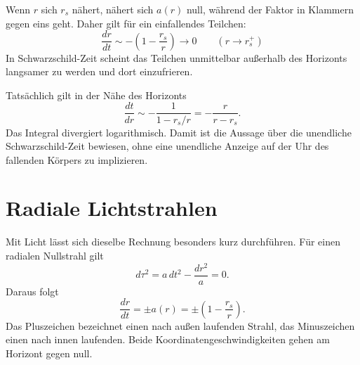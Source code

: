 Wenn \(r\) sich \(r_s\) nähert, nähert sich \(a(r)\) null, während der Faktor in Klammern gegen eins geht. Daher gilt für ein einfallendes Teilchen:
\begin{equation}
\frac{dr}{dt}
\sim -\left(1-\frac{r_s}{r}\right)
\longrightarrow 0
\qquad(r\longrightarrow r_s^+)
\label{eq:l5-infall-freeze}
\end{equation}
In Schwarzschild-Zeit scheint das Teilchen unmittelbar außerhalb des Horizonts langsamer zu werden und dort einzufrieren.

\begin{classroomqa}
\end{classroomqa}

Tatsächlich gilt in der Nähe des Horizonts
\begin{equation}
\frac{dt}{dr}
\sim-\frac{1}{1-r_s/r}
=-\frac{r}{r-r_s}.
\end{equation}
Das Integral divergiert logarithmisch. Damit ist die Aussage über die unendliche Schwarzschild-Zeit bewiesen, ohne eine unendliche Anzeige auf der Uhr des fallenden Körpers zu implizieren.

\section{Radiale Lichtstrahlen}

Mit Licht lässt sich dieselbe Rechnung besonders kurz durchführen. Für einen radialen Nullstrahl gilt
\begin{equation}
d\tau^2
=a\,dt^2-\frac{dr^2}{a}=0.
\end{equation}
Daraus folgt
\begin{equation}
\boxed{
\frac{dr}{dt}
=\pm a(r)
=\pm\left(1-\frac{r_s}{r}\right).
}
\label{eq:l5-radial-light}
\end{equation}
Das Pluszeichen bezeichnet einen nach außen laufenden Strahl, das Minuszeichen einen nach innen laufenden. Beide Koordinatengeschwindigkeiten gehen am Horizont gegen null.

\begin{classroomqa}
\end{classroomqa}


